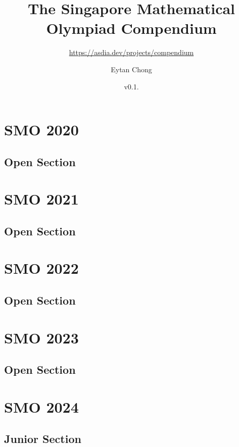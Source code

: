 \documentclass[a4paper,listof=totoc,bibliography=totoc,openany]{scrbook}
\title{The Singapore Mathematical Olympiad Compendium}
\subtitle{\url{https://asdia.dev/projects/compendium}}
\author{Eytan Chong}
\date{v0.1.\datetwo}
\begin{document}
\maketitle

\frontmatter

\tableofcontents



\mainmatter


\chapter{SMO 2020}
\section{Open Section}


\chapter{SMO 2021}
\section{Open Section}


\chapter{SMO 2022}
\section{Open Section}



\chapter{SMO 2023}
\section{Open Section}



\chapter{SMO 2024}
\section{Junior Section}


\end{document}
